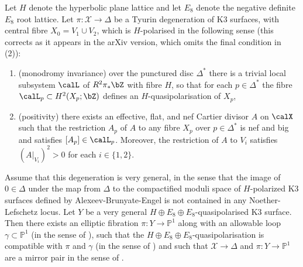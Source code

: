 Let $H$ denote the hyperbolic plane lattice and let $E_8$ denote the negative definite $E_8$ root lattice. Let $\pi \colon \mathcal{X} \to \Delta$ be a Tyurin degeneration of K3 surfaces, with central fibre $X_0 = V_1 \cup V_2$, which is $H$-polarised in the following sense (this corrects \cite[Definition 3.20]{dfk3slpms} as it appears in the arXiv version, which omits the final condition in (2)): \begin{enumerate} \item (monodromy invariance) over the punctured disc $\Delta^*$ there is a trivial local subsystem $\calL$ of $R^2\pi_*\bZ$ with fibre $H$, so that for each $p \in \Delta^*$ the fibre $\calL_p \subset H^2(X_p;\bZ)$ defines an $H$-quasi\-polarisation of $X_p$, \item (positivity) there exists an effective, flat, and nef Cartier divisor $A$ on $\calX$ such that the restriction $A_p$ of $A$ to any fibre $X_p$ over $p \in \Delta^*$ is nef and big and satisfies $[A_p] \in \calL_p$. Moreover, the restriction of $A$ to $V_i$ satisfies $(A|_{V_i})^2 > 0$ for each $i \in \{1,2\}$. \end{enumerate} Assume that this degeneration is very general, in the sense that the image of $0 \in \Delta$ under the map from $\Delta$ to the compactified moduli space of $H$-polarized K3 surfaces defined by Alexeev-Brunyate-Engel \cite{cmek3sspt} is not contained in any Noether-Lefschetz locus.  Let $Y$ be a very general $H \oplus E_8 \oplus E_8$-quasipolarised K3 surface. Then there exists an elliptic fibration $\pi \colon Y \to \mathbb{P}^1$ along with an allowable loop $\gamma \subset \mathbb{P}^1$ (in the sense of \cite[Definition 4.11]{dfk3slpms}), such that the $H \oplus E_8 \oplus E_8$-quasipolarisation is compatible with $\pi$ and $\gamma$ (in the sense of \cite[Definition 4.21]{dfk3slpms}) and such that $\mathcal{X} \to \Delta$ and $\pi \colon Y \to \mathbb{P}^1$ are a mirror pair in the sense of \cite[Definition 5.1]{dfk3slpms}. \providecommand{\bysame}{\leavevmode\hbox to3em{\hrulefill}\thinspace} \providecommand{\MR}{\relax\ifhmode\unskip\space\fi MR }%